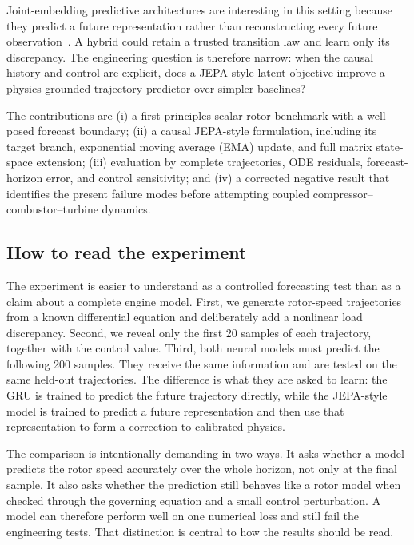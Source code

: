 \documentclass[10pt,journal]{IEEEtran}
\begin{document}
Joint-embedding predictive architectures are interesting in this setting because they predict a future representation rather than reconstructing every future observation~\cite{assran2023ijepa,bardes2024vjepa}. A hybrid could retain a trusted transition law and learn only its discrepancy. The engineering question is therefore narrow: when the causal history and control are explicit, does a JEPA-style latent objective improve a physics-grounded trajectory predictor over simpler baselines?

The contributions are (i) a first-principles scalar rotor benchmark with a well-posed forecast boundary; (ii) a causal JEPA-style formulation, including its target branch, exponential moving average (EMA) update, and full matrix state-space extension; (iii) evaluation by complete trajectories, ODE residuals, forecast-horizon error, and control sensitivity; and (iv) a corrected negative result that identifies the present failure modes before attempting coupled compressor--combustor--turbine dynamics.

\subsection{How to read the experiment}
The experiment is easier to understand as a controlled forecasting test than as a claim about a complete engine model. First, we generate rotor-speed trajectories from a known differential equation and deliberately add a nonlinear load discrepancy. Second, we reveal only the first 20 samples of each trajectory, together with the control value. Third, both neural models must predict the following 200 samples. They receive the same information and are tested on the same held-out trajectories. The difference is what they are asked to learn: the GRU is trained to predict the future trajectory directly, while the JEPA-style model is trained to predict a future representation and then use that representation to form a correction to calibrated physics.

The comparison is intentionally demanding in two ways. It asks whether a model predicts the rotor speed accurately over the whole horizon, not only at the final sample. It also asks whether the prediction still behaves like a rotor model when checked through the governing equation and a small control perturbation. A model can therefore perform well on one numerical loss and still fail the engineering tests. That distinction is central to how the results should be read.
\end{document}
